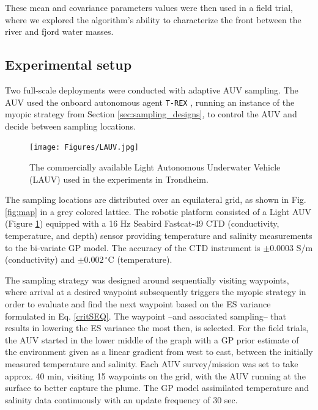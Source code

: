 \documentclass[aoas]{imsart}
\begin{document}
These mean and covariance parameters values were then used in a field
trial, where we explored the algorithm's ability to characterize the
front between the river and fjord water masses.

\subsection{Experimental setup}

Two full-scale deployments were conducted with adaptive AUV sampling.
The AUV used the onboard autonomous agent \texttt{T-REX}
\citep{py10,Rajan12,Rajan12b}, running an instance of the myopic
strategy from Section \ref{sec:sampling_designs}, to control the AUV
and decide between sampling locations.

\begin{figure}[!b] 
 \centering 
\texttt{[image: Figures/LAUV.jpg]}
\caption{The commercially available Light Autonomous Underwater
  Vehicle (LAUV) used in the experiments in Trondheim.}
\label{fig:lauv}
\end{figure}


The sampling locations are distributed over an equilateral grid, as
shown in Fig. \ref{fig:map} in a grey colored lattice. The robotic
platform consisted of a Light AUV \citep{sousa2012lauv} (Figure
\ref{fig:lauv}) equipped with a 16 Hz Seabird Fastcat-49 CTD
(conductivity, temperature, and depth) sensor providing temperature
and salinity measurements to the bi-variate GP model. The accuracy of
the CTD instrument is $\pm 0.0003$ S/m (conductivity) and
$\pm0.002\,^{\circ}\mathrm{C}$ (temperature).



The sampling strategy was designed around sequentially visiting
waypoints, where arrival at a desired waypoint subsequently triggers
the myopic strategy in order to evaluate and find the next waypoint
based on the ES variance formulated in Eq. \eqref{critSEQ}. The
waypoint --and associated sampling-- that results in lowering the ES
variance the most then, is selected. For the field trials, the AUV
started in the lower middle of the graph with a GP prior estimate of
the environment given as a linear gradient from west to east, between
the initially measured temperature and salinity. Each AUV
survey/mission was set to take approx. 40 min, visiting 15 waypoints
on the grid, with the AUV running at the surface to better capture the
plume. The GP model assimilated temperature and salinity data
continuously with an update frequency of 30 sec.
\end{document}
